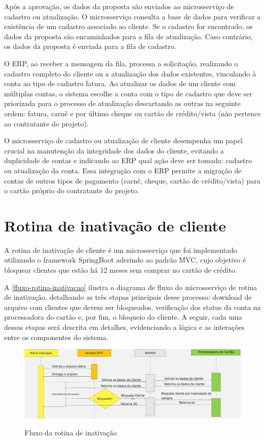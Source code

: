 Após a aprovação, os dados da proposta são enviados ao microsserviço de 
cadastro ou atualização. O microsserviço consulta a base de dados para verificar a 
existência de um cadastro associado ao cliente. Se o cadastro for encontrado, 
os dados da proposta são encaminhados para a fila de atualização. 
Caso contrário, os dados da proposta é enviada para a fila de cadastro.

O ERP, ao receber a mensagem da fila, 
processa a solicitação, realizando o cadastro completo do
cliente ou a atualização dos dados existentes, vinculando à conta ao tipo de 
cadastro fatura. Ao atualizar os dados de um cliente com múltiplas contas, 
o sistema escolhe a conta com o tipo de cadastro que deve ser priorizada para 
o processo de atualização descartando as outras na seguinte ordem: 
fatura, carnê e por último cheque ou cartão de crédito/vista (não pertence ao contratante  do projeto).

O microsserviço de cadastro ou atualização de cliente desempenha um papel crucial na manutenção 
da integridade dos dados do cliente, evitando a duplicidade de contas e indicando 
ao ERP qual ação deve ser tomada: cadastro ou atualização da conta. Essa integração com o ERP permite a migração  de contas de 
outros tipos de pagamento (carnê, cheque, cartão de crédito/vista) para o cartão próprio do 
contratante do projeto. 


\section{Rotina de inativação de cliente}

A rotina de inativação de cliente é um microsserviço que foi implementado utilizando o 
framework SpringBoot aderindo ao padrão MVC, cujo objetivo é bloquear 
clientes que estão há 12 meses sem comprar no cartão de crédito.

A \autoref{fluxo-rotina-inativacao} ilustra o diagrama de fluxo do microsserviço 
de rotina de inativação, detalhando as três etapas principais desse processo: 
download de arquivo com clientes que devem ser bloqueados, verificação dos status 
da conta na processadora do cartão e, por fim, o bloqueio do cliente. A seguir, 
cada uma dessas etapas será descrita em detalhes, evidenciando a lógica e as 
interações entre os componentes do sistema. 

\begin{figure} [!h]
    \centering
    \caption{Fluxo da rotina de inativação}
    \includegraphics[width=1\textwidth]{arquivos/imagens/fluxo-rotina-inativacao.jpg}
    \label{fluxo-rotina-inativacao}
\end{figure}

